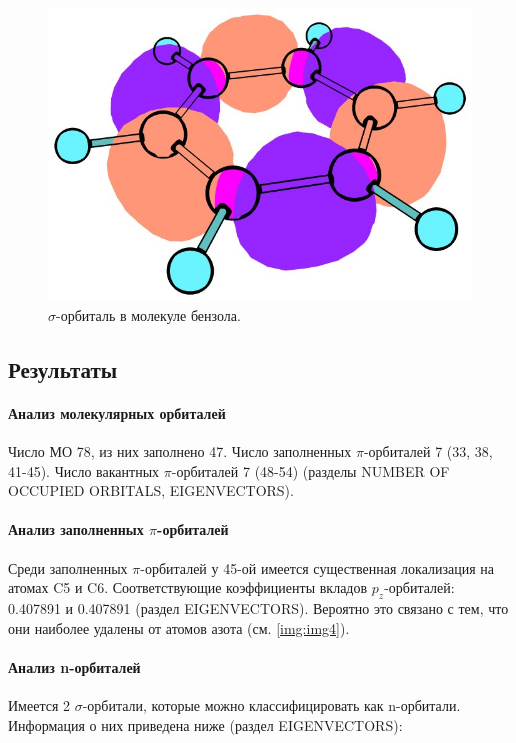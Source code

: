 \begin{figure}[H]
\centering
\captionsetup{justification=centering}
\includegraphics[scale=0.4]{fig/3.jpg}
\caption{$\sigma$-орбиталь в молекуле бензола.}
\end{figure}


\subsection{Результаты}
\paragraph*{Анализ молекулярных орбиталей}
Число МО 78, из них заполнено 47. Число заполненных $\pi$-орбиталей 7 (33, 38, 41-45). Число вакантных $\pi$-орбиталей 7 (48-54) (разделы NUMBER OF OCCUPIED ORBITALS, EIGENVECTORS).
\paragraph*{Анализ заполненных $\pi$-орбиталей}
Среди заполненных $\pi$-орбиталей у 45-ой имеется существенная локализация на атомах C5 и C6. Соответствующие коэффициенты вкладов $p_z$-орбиталей: 0.407891 и 0.407891 (раздел EIGENVECTORS). Вероятно это связано с тем, что они наиболее удалены от атомов азота (см. \ref{img:img4}).
\paragraph*{Анализ n-орбиталей}
Имеется 2 $\sigma$-орбитали, которые можно классифицировать как n-орбитали. Информация о них приведена ниже (раздел EIGENVECTORS):

